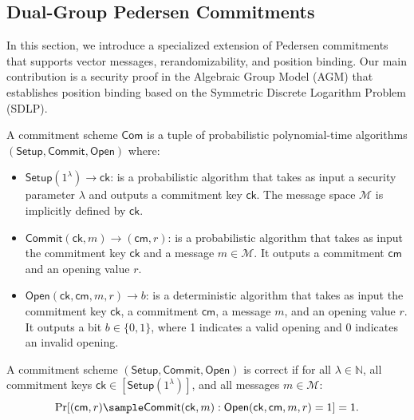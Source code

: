 \subsection{Dual-Group Pedersen Commitments}\label{sec:commitment}
In this section, we introduce a specialized extension of Pedersen commitments that supports vector messages, rerandomizability, and position binding. Our main contribution is a security proof in the Algebraic Group Model (AGM) that establishes position binding based on the Symmetric Discrete Logarithm Problem (SDLP).


\begin{definition}\label{def:commitmentscheme}
A commitment scheme $\mathsf{Com}$ is a tuple of probabilistic polynomial-time algorithms $(\mathsf{Setup}, \mathsf{Commit}, \mathsf{Open})$ where:
\begin{itemize}
    \item $\mathsf{Setup}(1^\lambda) \rightarrow \mathsf{ck}$: is a probabilistic algorithm that takes as input a security parameter $\lambda$ and outputs a commitment key $\mathsf{ck}$. The message space $\mathcal{M}$ is implicitly defined by $\mathsf{ck}$.
    
    \item $\mathsf{Commit}(\mathsf{ck}, m) \rightarrow (\mathsf{cm}, r)$: is a probabilistic algorithm that takes as input the commitment key $\mathsf{ck}$ and a message $m \in \mathcal{M}$. It outputs a commitment $\mathsf{cm}$ and an opening value $r$.
    
    \item $\mathsf{Open}(\mathsf{ck}, \mathsf{cm}, m, r) \rightarrow b$: is a deterministic algorithm that takes as input the commitment key $\mathsf{ck}$, a commitment $\mathsf{cm}$, a message $m$, and an opening value $r$. It outputs a bit $b \in \{0,1\}$, where 1 indicates a valid opening and 0 indicates an invalid opening.
\end{itemize}
\end{definition}

\begin{definition}[Correctness]
A commitment scheme $(\mathsf{Setup}, \mathsf{Commit}, \mathsf{Open})$ is correct if for all $\lambda \in \mathbb{N}$, all commitment keys $\mathsf{ck} \in [\mathsf{Setup}(1^\lambda)]$, and all messages $m \in \mathcal{M}$:
$$\Pr[(\mathsf{cm}, r) \sample \mathsf{Commit}(\mathsf{ck}, m) : \mathsf{Open}(\mathsf{ck}, \mathsf{cm}, m, r) = 1] = 1.$$
\end{definition}

